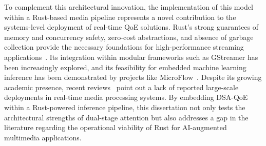 To complement this architectural innovation, the implementation of this model within a Rust-based media pipeline represents a novel contribution to the systems-level deployment of real-time QoE solutions. Rust's strong guarantees of memory and concurrency safety, zero-cost abstractions, and absence of garbage collection provide the necessary foundations for high-performance streaming applications~\cite{fulton2022benefits}. Its integration within modular frameworks such as GStreamer has been increasingly explored, and its feasibility for embedded machine learning inference has been demonstrated by projects like MicroFlow~\cite{carnelos2025microflow}. Despite its growing academic presence, recent reviews~\cite{beltran2024review,sharma2023rust} point out a lack of reported large-scale deployments in real-time media processing systems. By embedding DSA-QoE within a Rust-powered inference pipeline, this dissertation not only tests the architectural strengths of dual-stage attention but also addresses a gap in the literature regarding the operational viability of Rust for AI-augmented multimedia applications.